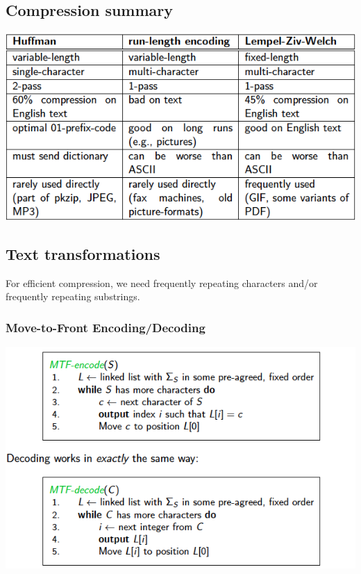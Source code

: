 \documentclass{article}
\begin{document}
\subsection*{Compression summary}
\includegraphics[scale=0.6]{3}

\subsection*{Text transformations}
For efficient compression, we need frequently repeating characters and/or frequently repeating substrings. 

\subsubsection*{Move-to-Front Encoding/Decoding}
\begin{center}
\includegraphics[scale=0.5]{4}
\end{center}
\end{document}
